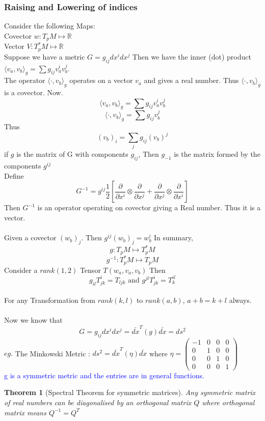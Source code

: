\documentclass{article}
\newtheorem{theorem}{Theorem}[section]
\newcommand\note[1]{\textcolor{blue}{#1}}
\begin{document}
\subsubsection{Raising and Lowering of indices}
Consider the following Maps:\\
Covector $w:T_p M \mapsto \mathbb{R} $  \\
Vector    $V: T^*_p M \mapsto \mathbb{R}$ 
\\ Suppose we have a metric $G = g_{ij} dx^idx^j$ Then we have the inner (dot) product $\langle v_a,v_b \rangle_g = \sum g_{ij}v_a^iv_b^j$. 
\\
The operator $ \langle \cdot, v_b \rangle_g$ operates on a vector $v_a$ and gives a real number. Thus  $ \langle \cdot, v_b \rangle_g$ is a covector.
Now.
$$\langle v_a,v_b \rangle_g = \sum g_{ij}v_a^iv_b^j$$
$$\langle \cdot,v_b \rangle_g = \sum g_{ij}v_b^j$$
Thus $$(v_b)_i = \sum_j g_{ij} (v_b)^j $$
if $g$ is the matrix of G with components $g_{ij}$, Then $g_{-1} $ is the matrix formed by the components $g^{ij}$ \\
Define$$\boxed{G^{-1} = g^{ij} \frac{1}{2}[\frac{\partial }{\partial x^i} \otimes \frac{\partial}{\partial x^j} +\frac{\partial }{\partial x^j} \otimes \frac{\partial}{\partial x^i}   ]} $$  
Then $G^{-1}$ is an operator operating on covector giving a Real number. Thus it is a vector. \\ \\
Given a covector $(w_b)_j$. Then $g^{ij} (w_b)_j = w^i_b$  
In summary, $$g: T_pM \mapsto T^*_p M$$ $$g^{-1}: T^*_pM \mapsto T_p M$$  
Consider a $rank(1,2)$ Tensor $T(w_a,v_a,v_b)$ Then$$g_{il} T^i_{jk} = T_{ljk} \text{   and    }  g^{jl}T^i_{jk} = T^{il}_k$$
\\
For any Transformation from $rank(k,l)$ to $rank(a,b)$, $a+b=k+l$ always.
\\ \\ 
Now we know that $$G = g_{ij}dx^idx^j = \bar{dx}^T (g)\bar{dx}= ds^2$$
$eg.$ The Minkowski Metric : $ds^2 = \bar{dx}^T (\eta)\bar{dx}$ where $\eta =\begin{pmatrix}
    -1&0&0&0\\
    0&1&0&0\\
    0&0&1&0\\
    0&0&0&1
\end{pmatrix} $
\\
\note{g is a symmetric metric and the entries are in general functions.} 
\begin{theorem}[Spectral Theorem for symmetric matrices]
    Any symmetric matrix of real numbers can be diagonalised by an orthogonal matrix $Q$ where orthogonal matrix means $Q^{-1} = Q^T$
\end{theorem}
\end{document}

